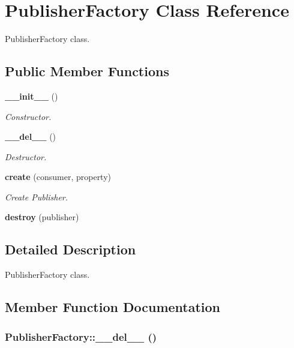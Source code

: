 \section{Publisher\-Factory Class Reference}
\label{classPublisherFactory}
Publisher\-Factory class.  


\subsection*{Public Member Functions}
\begin{CompactItemize}
\item 
{\bf \_\-\_\-init\_\-\_\-} ()
\begin{CompactList}\small\item\em Constructor. \item\end{CompactList}\item 
{\bf \_\-\_\-del\_\-\_\-} ()
\begin{CompactList}\small\item\em Destructor. \item\end{CompactList}\item 
{\bf create} (consumer, property)
\begin{CompactList}\small\item\em Create Publisher. \item\end{CompactList}\item 
{\bf destroy} (publisher)
\end{CompactItemize}


\subsection{Detailed Description}
Publisher\-Factory class. 



\subsection{Member Function Documentation}
\subsubsection{\setlength{\rightskip}{0pt plus 5cm}Publisher\-Factory::\_\-\_\-del\_\-\_\- ()}\label{classPublisherFactory_PublisherFactorya1}



